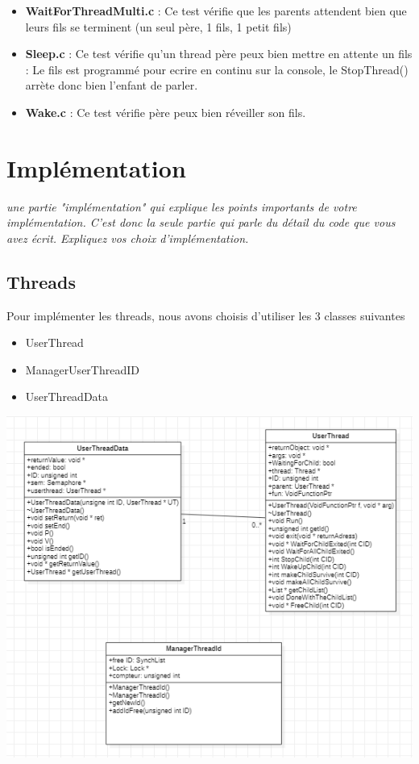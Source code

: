 \documentclass{article}
\begin{document}
\begin{itemize}
\item \textbf{WaitForThreadMulti.c} : Ce test vérifie que les parents attendent bien que leurs fils se terminent (un seul père, 1 fils, 1 petit fils)
		
		\item \textbf{Sleep.c} : Ce test vérifie qu'un thread père peux bien mettre en attente un fils : Le fils est programmé pour ecrire en continu sur la console, le StopThread() arrète donc bien l'enfant de parler.

\item \textbf{Wake.c} :	Ce test vérifie père peux bien réveiller son fils.
		
	
	

\end{itemize} 

\newpage
\section{Implémentation}
\textit{une partie "implémentation" qui explique les points importants de votre implémentation. C'est donc la seule partie qui parle du détail du code que vous avez écrit. Expliquez vos choix d'implémentation.
}
\vspace{5mm}

\subsection{Threads}




Pour implémenter les threads, nous avons choisis d'utiliser les 3 classes suivantes
\begin{itemize}
\item
UserThread
\item
ManagerUserThreadID
\item
UserThreadData
\end{itemize}
\includegraphics{code/userprog/UserThread.PNG}
\end{document}
